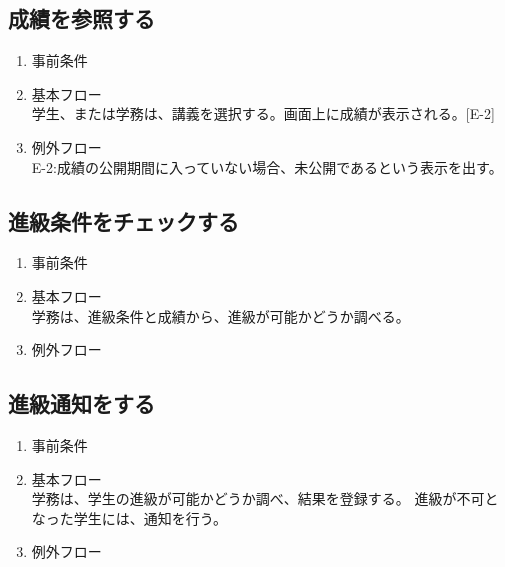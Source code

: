 \documentclass[a4paper,10pt]{jsarticle}
\begin{document}
\subsection{成績を参照する}
\begin{enumerate}
  \item 事前条件
  \item 基本フロー\\
        学生、または学務は、講義を選択する。画面上に成績が表示される。[E-2]
  \item 例外フロー\\
        E-2:成績の公開期間に入っていない場合、未公開であるという表示を出す。
\end{enumerate}

\subsection{進級条件をチェックする}
\begin{enumerate}
  \item 事前条件
  \item 基本フロー\\
        学務は、進級条件と成績から、進級が可能かどうか調べる。
  \item 例外フロー
\end{enumerate}

\subsection{進級通知をする}
\begin{enumerate}
  \item 事前条件
  \item 基本フロー\\
        学務は、学生の進級が可能かどうか調べ、結果を登録する。
        進級が不可となった学生には、通知を行う。
  \item 例外フロー
\end{enumerate}
\end{document}
